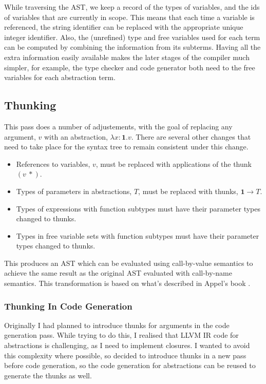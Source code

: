While traversing the AST, we keep a record of the types of variables, and the ids of variables that are currently
in scope.
This means that each time a variable is referenced, the string identifier can be replaced with the appropriate
unique integer identifier.
Also, the (unrefined) type and free variables used for each term can be computed by combining
the information from its subterms.
Having all the extra information easily available makes the later stages of the compiler much simpler,
for example, the type checker and code generator both need to the free variables for each abstraction term.

\subsection{Thunking}

This pass does a number of adjustements, with the goal of replacing any argument, $v$ with an abstraction,
$\lambda x: \textbf{1} . v$.
There are several other changes that need to take place for the syntax tree to remain consistent under this
change.
\begin{itemize}
    \item References to variables, $v$, must be replaced with applications of the thunk $(v\ \ast)$.
    \item Types of parameters in abstractions, $T$, must be replaced with thunks, $\textbf{1} \rightarrow T$.
    \item Types of expressions with function subtypes must have their parameter types changed to thunks.
    \item Types in free variable sets with function subtypes must have their parameter types changed to thunks.
\end{itemize}
This produces an AST which can be evaluated using call-by-value semantics to achieve the same result as
the original AST evaluated with call-by-name semantics.
This transformation is based on what's described in Appel's book \cite{appel1998}.

\subsubsection{Thunking In Code Generation}

Originally I had planned to introduce thunks for arguments in the code generation pass.
While trying to do this, I realised that LLVM IR code for abstractions is challenging, as I need to
implement closures.
I wanted to avoid this complexity where possible, so decided to introduce thunks in a new pass before
code generation, so the code generation for abstractions can be reused to generate the thunks as well.

